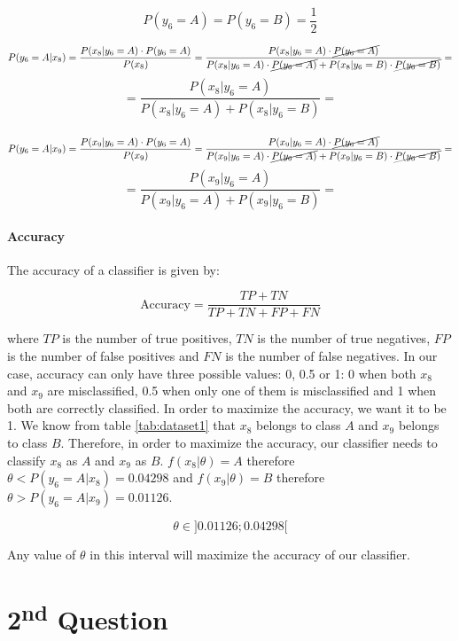 \documentclass{article}
\begin{document}
\[ P(y_6 = A) = P(y_6 = B) = \frac{1}{2} \]

\[ P(y_6 = A|x_8) = \frac{P(x_8 | y_6 = A) \cdot P(y_6 = A)}{P(x_8)} = \frac{P(x_8 | y_6 = A) \cdot \cancel{P(y_6 = A)}}{P(x_8 | y_6 = A)\cdot \cancel{P(y_6 = A)} + P(x_8 | y_6 = B)\cdot \cancel{P(y_6 = B)}} = \]
\[ = \frac{P(x_8 | y_6 = A)}{P(x_8 | y_6 = A) + P(x_8 | y_6 = B)} = \]

\paragraph{}

\[ P(y_6 = A|x_9) = \frac{ P(x_9 | y_6 = A) \cdot P(y_6 = A)}{P(x_9)} = \frac{P(x_9 | y_6 = A) \cdot \cancel{P(y_6 = A)}}{P(x_9 | y_6 = A)\cdot \cancel{P(y_6 = A)} + P(x_9 | y_6 = B)\cdot \cancel{P(y_6 = B)}} = \]
\[ = \frac{P(x_9 | y_6 = A)}{P(x_9 | y_6 = A) + P(x_9 | y_6 = B)} = \]

\paragraph{Accuracy}

The accuracy of a classifier is given by:

\[ \text{Accuracy} = \frac{TP + TN}{TP + TN + FP + FN} \]

where $TP$ is the number of true positives, $TN$ is the number of true negatives, $FP$ is the number of false positives and $FN$ is the number of false negatives.
In our case, accuracy can only have three possible values: 0, 0.5 or 1: 0 when both $x_8$ and $x_9$ are misclassified, 0.5 when only one of them is misclassified and 1 when both are correctly classified.
In order to maximize the accuracy, we want it to be 1. We know from table \ref{tab:dataset1} that $x_8$ belongs to class $A$ and $x_9$ belongs to class $B$. Therefore, in order to maximize the accuracy, our classifier needs to classify $x_8$ as $A$ and $x_9$ as $B$.
$f(x_8|\theta) = A$ therefore $\theta < P(y_6=A|x_8) = 0.04298$ and $f(x_9|\theta) = B$ therefore $\theta > P(y_6=A|x_9) = 0.01126$. 

\[ \theta \in ]0.01126; 0.04298[ \]

Any value of $\theta$ in this interval will maximize the accuracy of our classifier.

\newpage

\section*{2\textsuperscript{nd} Question}
\end{document}
